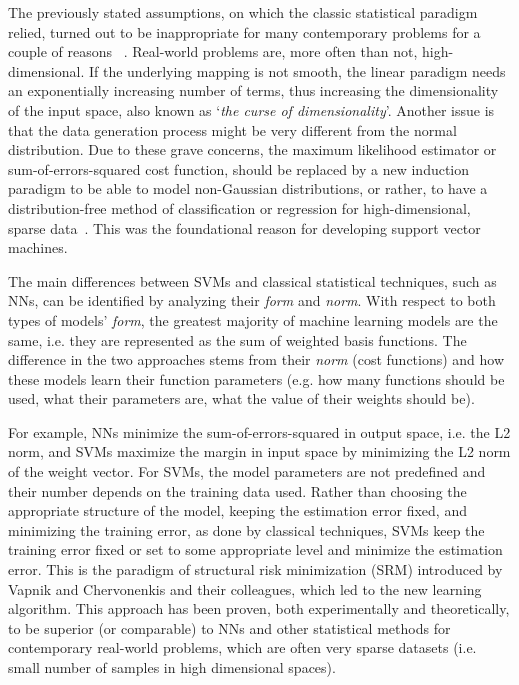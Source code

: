 \documentclass[reqno]{vcuthesis}
\numberwithin{equation}{chapter}
\begin{document}
The previously stated assumptions, on which the classic statistical paradigm relied, turned out to be inappropriate for many contemporary problems for a couple of reasons~\cite{vapnik1997support} . Real-world problems are, more often than not, high-dimensional. If the underlying mapping is not smooth, the linear paradigm needs an exponentially increasing number of terms, thus increasing the dimensionality of the input space, also known as `\textit{the curse of dimensionality}'. Another issue is that the data generation process might be very different from the normal distribution. Due to these grave concerns, the maximum likelihood estimator or sum-of-errors-squared cost function, should be replaced by a new induction paradigm to be able to model non-Gaussian distributions, or rather, to have a distribution-free method of classification or regression for high-dimensional, sparse data~\cite{Kecman2001}. This was the foundational reason for developing support vector machines.

The main differences between SVMs and classical statistical techniques, such as NNs, can be identified by analyzing their \textit{form} and \textit{norm}. With respect to both types of models' \textit{form}, the greatest majority of machine learning models are the same, i.e. they are represented as the sum of weighted basis functions. The difference in the two approaches stems from their \textit{norm} (cost functions) and how these models learn their function parameters (e.g. how many functions should be used, what their parameters are, what the value of their weights should be). 

For example, NNs minimize the sum-of-errors-squared in output space, i.e. the L2 norm, and SVMs maximize the margin in input space by minimizing the L2 norm of the weight vector. For SVMs, the model parameters are not predefined and their number depends on the training data used. Rather than choosing the appropriate structure of the model, keeping the estimation error fixed, and minimizing the training error, as done by classical techniques, SVMs keep the training error fixed or set to some appropriate level and minimize the estimation error. This is the paradigm of structural risk minimization (SRM) introduced by Vapnik and Chervonenkis and their colleagues, which led to the new learning algorithm. This approach has been proven, both experimentally and theoretically, to be superior (or comparable) to NNs and other statistical methods for contemporary real-world problems, which are often very sparse datasets (i.e. small number of samples in high dimensional spaces).
\end{document}
